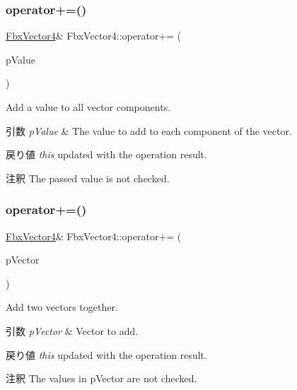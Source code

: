\subsubsection{\texorpdfstring{operator+=()}{operator+=()}\hspace{0.1cm}{\footnotesize\ttfamily [1/2]}}
{\footnotesize\ttfamily \hyperlink{class_fbx_vector4}{Fbx\+Vector4}\& Fbx\+Vector4\+::operator+= (\begin{DoxyParamCaption}\item[{double}]{p\+Value }\end{DoxyParamCaption})}

Add a value to all vector components. 
\begin{DoxyParams}{引数}
{\em p\+Value} & The value to add to each component of the vector. \\
\hline
\end{DoxyParams}
\begin{DoxyReturn}{戻り値}
{\itshape this} updated with the operation result. 
\end{DoxyReturn}
\begin{DoxyRemark}{注釈}
The passed value is not checked. 
\end{DoxyRemark}
\mbox{\label{class_fbx_vector4_a0db8c14b539c1a47b3a7a996569e1c89}} 
\subsubsection{\texorpdfstring{operator+=()}{operator+=()}\hspace{0.1cm}{\footnotesize\ttfamily [2/2]}}
{\footnotesize\ttfamily \hyperlink{class_fbx_vector4}{Fbx\+Vector4}\& Fbx\+Vector4\+::operator+= (\begin{DoxyParamCaption}\item[{const \hyperlink{class_fbx_vector4}{Fbx\+Vector4} \&}]{p\+Vector }\end{DoxyParamCaption})}

Add two vectors together. 
\begin{DoxyParams}{引数}
{\em p\+Vector} & Vector to add. \\
\hline
\end{DoxyParams}
\begin{DoxyReturn}{戻り値}
{\itshape this} updated with the operation result. 
\end{DoxyReturn}
\begin{DoxyRemark}{注釈}
The values in p\+Vector are not checked. 
\end{DoxyRemark}
\mbox{\label{class_fbx_vector4_a121047a8e75df11dbd8ec10c0cff8cbb}} 
